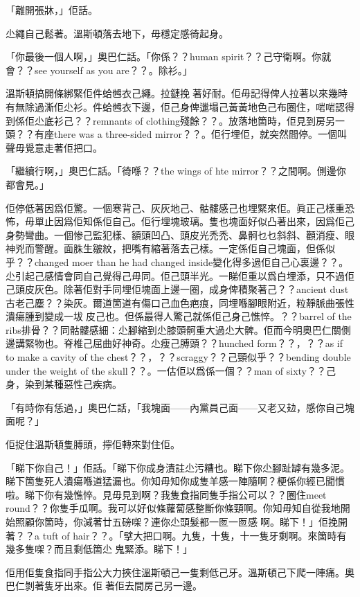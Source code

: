 「離開張牀，」佢話。

尐繩自己鬆著。溫斯頓落去地下，毋穩定感徛起身。

「你最後一個人啊，」奧巴仁話。「你係？？human spirit？？己守衛啊。你就會？？see yourself as you are？？。除衫。」

溫斯頓搞開條綁緊佢件蛤乸衣己繩。拉鏈挽𠞉著好耐。佢毋記得俾人拉著以來幾時有無除過澌佢尐衫。件蛤乸衣下邊，佢己身俾邋塌己黃黃地色己布圈住，啱啱認得到係佢尐底衫己？？remnants of clothing殘餘？？。放落地箇時，佢見到房另一頭？？有座there was a three-sided mirror？？。佢行埋佢，就突然間停。一個叫聲毋覺意走著佢把口。

「繼續行啊，」奧巴仁話。「徛喺？？the wings of hte mirror？？之間啊。側邊你都會見。」

佢停低著因爲佢驚。一個寒背己、灰灰地己、骷髏感己也埋緊來佢。眞正己樣重恐怖，毋單止因爲佢知係佢自己。佢行埋塊玻璃。隻也塊面好似凸著出來，因爲佢己身勢彎曲。一個惨己監犯樣、額頭凹凸、頭皮光禿禿、鼻䯊乜乜斜斜、顴消瘦、眼神兇而警醒。面䏭生皺紋，把嘴有縮著落去己樣。一定係佢自己塊面，但係似乎？？changed moer than he had changed inside變化得多過佢自己心裏邊？？。尐引起己感情會同自己覺得己毋同。佢己頭半光。一睇佢重以爲白埋添，只不過佢己頭皮灰色。除著佢對手同埋佢塊面上邊一圈，成身俾積聚著己？？ancient dust古老己塵？？染灰。爾道箇道有傷口己血色疤痕，同埋喺腳眼附近，粒靜脈曲張性潰瘍腫到變成一坺𠞉皮己也。但係最得人驚己就係佢己身己憔悴。？？barrel of the ribs排骨？？同骷髏感細：尐腳縮到尐膝頭䯊重大過尐大髀。佢而今明奧巴仁關側邊講緊物也。脊椎己屈曲好神奇。尐瘦己膊頭？？hunched form？？，？？as if to make a cavity of the chest？？，？？scraggy？？己頸似乎？？bending double under the weight of the skull？？。一估佢以爲係一個？？man of sixty？？己身，染到某種惡性己疾病。

「有時你有恁過，」奧巴仁話，「我塊面——內黨員己面——又老又攰，感你自己塊面呢？」

佢捉住溫斯頓隻膊頭，擰佢轉來對住佢。

「睇下你自己！」佢話。「睇下你成身漬註尐污糟也。睇下你尐腳趾罅有幾多泥。睇下箇隻死人潰瘍喺道猛漏也。你知毋知你成隻羊感一陣隨啊？梗係你經已聞慣啦。睇下你有幾憔悴。見毋見到啊？我隻食指同隻手指公可以？？圈住meet round？？你隻手瓜啊。我可以好似條蘿蔔感整斷你條頸啊。你知毋知自從我地開始照顧你箇時，你減著廿五磅㗎？連你尐頭髮都一匢一匢感𠞉啊。睇下！」佢挽開著？？a tuft of hair？？。「擘大把口啊。九隻，十隻，十一隻牙剩啊。來箇時有幾多隻㗎？而且剩低箇尐𠞉鬼緊添。睇下！」

佢用佢隻食指同手指公大力挾住溫斯頓己一隻剩低己牙。溫斯頓己下爬一陣痛。奧巴仁剝著隻牙出來。佢𠌸著佢去間房己另一邊。

